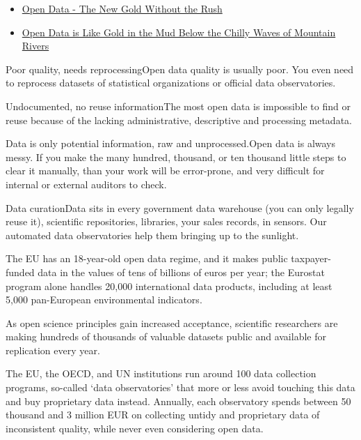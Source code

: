 \documentclass[
  a4paper,
  openany, a4paper, oneside]{book}
\providecommand{\tightlist}{%
  \setlength{\itemsep}{0pt}\setlength{\parskip}{0pt}}
\begin{document}
\begin{itemize}
\tightlist
\item
  \href{https://dataandlyrics.com/post/2021-06-18-gold-without-rush/}{Open Data - The New Gold Without the Rush}
\item
  \href{https://greendeal.dataobservatory.eu/post/2021-06-10-founder-daniel-antal/}{Open Data is Like Gold in the Mud Below the Chilly Waves of Mountain Rivers}
\end{itemize}

Poor quality, needs reprocessingOpen data quality is usually poor. You even need to reprocess datasets of statistical organizations or official data observatories.

Undocumented, no reuse informationThe most open data is impossible to find or reuse because of the lacking administrative, descriptive and processing metadata.

Data is only potential information, raw and unprocessed.Open data is always messy. If you make the many hundred, thousand, or ten thousand little steps to clear it manually, than your work will be error-prone, and very difficult for internal or external auditors to check.

Data curationData sits in every government data warehouse (you can only legally reuse it), scientific repositories, libraries, your sales records, in sensors. Our automated data observatories help them bringing up to the sunlight.

The EU has an 18-year-old open data regime, and it makes public taxpayer-funded data in the values of tens of billions of euros per year; the Eurostat program alone handles 20,000 international data products, including at least 5,000 pan-European environmental indicators.

As open science principles gain increased acceptance, scientific researchers are making hundreds of thousands of valuable datasets public and available for replication every year.

The EU, the OECD, and UN institutions run around 100 data collection programs, so-called `data observatories' that more or less avoid touching this data and buy proprietary data instead. Annually, each observatory spends between 50 thousand and 3 million EUR on collecting untidy and proprietary data of inconsistent quality, while never even considering open data.
\end{document}

